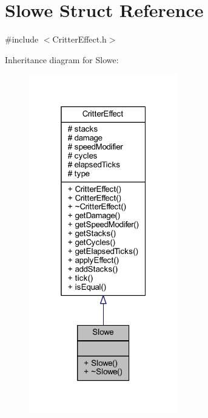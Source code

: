 \hypertarget{struct_slowe}{\section{Slowe Struct Reference}
\label{struct_slowe}
}


{\ttfamily \#include $<$Critter\+Effect.\+h$>$}



Inheritance diagram for Slowe\+:
\nopagebreak
\begin{figure}[H]
\begin{center}
\leavevmode
\includegraphics[width=184pt]{struct_slowe__inherit__graph}
\end{center}
\end{figure}


